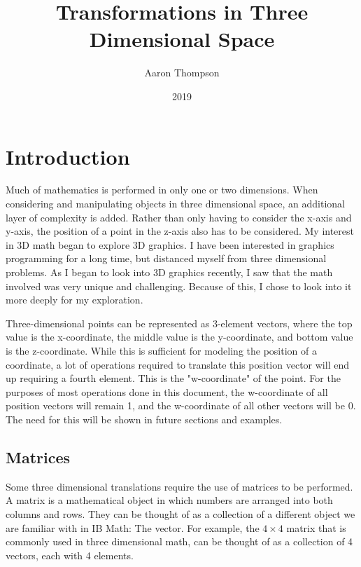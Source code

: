 \documentclass{article}
\title{Tran{}sformations in Three Dimensional Space}
\date{2019}
\author{Aaron Thompson}
\begin{document}
	\begin{titlepage}
		
		\maketitle
	
		\newpage
	
		\tableofcontents
	\end{titlepage}


	\newpage

	\section{Introduction}
	Much of mathematics is performed in only one or two dimensions. When considering and manipulating objects in three dimensional space, an additional layer of complexity is added. Rather than only having to consider the x-axis and y-axis, the position of a point in the z-axis also has to be considered. My interest in 3D math began to explore 3D graphics. I have been interested in graphics programming for a long time, but distanced myself from three dimensional problems. As I began to look into 3D graphics recently, I saw that the math involved was very unique and challenging. Because of this, I chose to look into it more deeply for my exploration. \par

	Three-dimensional points can be represented as 3-element vectors, where the top value is the x-coordinate, the middle value is the y-coordinate, and bottom value is the z-coordinate. While this is sufficient for modeling the position of a coordinate, a lot of operations required to translate this position vector will end up requiring a fourth element. This is the "w-coordinate" of the point. For the purposes of most operations done in this document, the w-coordinate of all position vectors will remain 1, and the w-coordinate of all other vectors will be 0. The need for this will be shown in future sections and examples.
	
	\subsection{Matrices}

	Some three dimensional translations require the use of matrices to be performed. A matrix is a mathematical object in which numbers are arranged into both columns and rows. They can be thought of as a collection of a different object we are familiar with in IB Math: The vector. For example, the $4 \times 4$ matrix that is commonly used in three dimensional math, can be thought of as a collection of 4 vectors, each with 4 elements. \par
\end{document}
